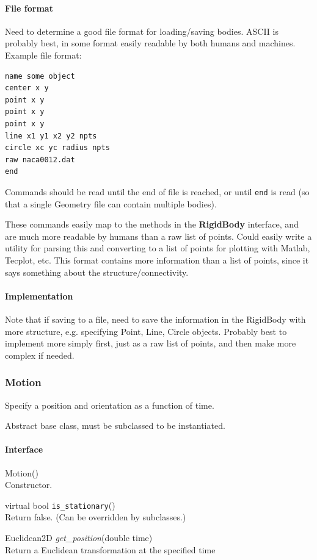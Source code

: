 \documentclass[11pt]{article}
\def\class#1{{\bf #1}} %
\def\fn#1{{\tt #1}} %
\def\virtualfn#1{{\it #1}} %
\begin{document}
\paragraph{File format}
Need to determine a good file format for loading/saving bodies.  ASCII is probably best, in some format easily readable by both humans and machines.  Example file format:
\begin{verbatim}
name some object
center x y
point x y
point x y
point x y
line x1 y1 x2 y2 npts
circle xc yc radius npts
raw naca0012.dat
end
\end{verbatim}
Commands should be read until the end of file is reached, or until {\tt end} is read (so that a single Geometry file can contain multiple bodies).

These commands easily map to the methods in the \class{RigidBody} interface, and are much more readable by humans than a raw list of points.  Could easily write a utility for parsing this and converting to a list of points for plotting with Matlab, Tecplot, etc.  This format contains more information than a list of points, since it says something about the structure/connectivity.

\paragraph{Implementation}
Note that if saving to a file, need to save the information in the RigidBody with more structure, e.g. specifying Point, Line, Circle objects.  Probably best to implement more simply first, just as a raw list of points, and then make more complex if needed.

\subsubsection{Motion}
Specify a position and orientation as a function of time.

Abstract base class, must be subclassed to be instantiated.

\paragraph{Interface}
\begin{description}
	\item Motion() \\
		Constructor.
	\item virtual bool \fn{is\_stationary}() \\
		Return false.  (Can be overridden by subclasses.)
	\item Euclidean2D \virtualfn{get\_position}(double time) \\
		Return a Euclidean transformation at the specified time
\end{description}
\end{document}
